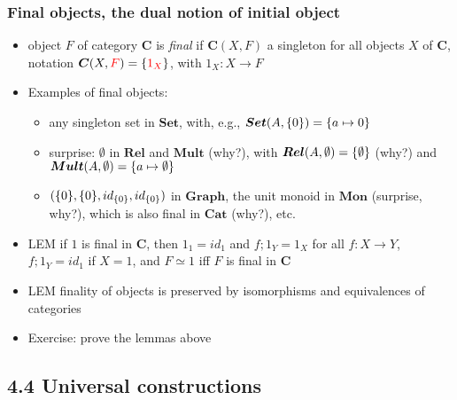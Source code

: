 \documentclass[handout]{beamer}
\newcommand{\bfsf}[1]{{\boldsymbol{#1}}}
\newcommand{\Set}{\bfsf{Set}}
\newcommand{\Gra}{\bfsf{Graph}}
\newcommand{\CC}{\bfsf{C}}
\newcommand{\Rel}{\bfsf{Rel}}
\newcommand{\Mult}{\bfsf{Mult}}
\newcommand{\Mon}{\bfsf{Mon}}
\newcommand{\Cat}{\bfsf{Cat}}
\begin{document}
\frame
  {   
    \frametitle{Final objects, the dual notion of initial object}\label{Ch4:FinalObj}

 \begin{itemize}[<+->]
\item object $F$ of category $\CC$ is \emph{final} 
if $\CC(X,F)$ a singleton for all objects $X$ of $\CC$, 
notation $\CC(X,{\color{red}F})=\set{{\color{red}1_X}}$, with $1_X : X\to F$
\item Examples of final objects: 
 \begin{itemize}
\item any singleton set in $\Set$, 
with, e.g., $\Set(A,\set{0})=\set{a\mapsto 0}$ %
\item surprise: $\emptyset$ in $\Rel$ and $\Mult$ (why?), 
with $\Rel(A,\emptyset) = \set{\emptyset} $ (why?) 
and $ \Mult(A,\emptyset) = \set{a\mapsto \emptyset}$
\item$(\{0\},\{0\},id_{\{0\}},id_{\{0\}})$
in $\Gra$, the unit monoid in $\Mon$ (surprise, why?), 
which is also final in $\Cat$ (why?), etc.
 \end{itemize} 
\item LEM if $1$ is final in $\CC$, then $1_1 = id_1$ 
and $f;1_Y = 1_X$ for all $f: X\to Y$, $f;1_Y = id_1$ if $X=1$,
and $F\simeq 1$ iff $F$ is final in $\CC$
\item LEM finality of objects is preserved by isomorphisms and
equivalences of categories
\item Exercise: prove the lemmas above
 \end{itemize}

 }

\subsection{4.4 Universal constructions}
 
\end{document}
